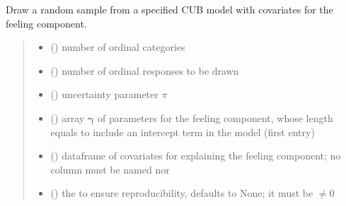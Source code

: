 \documentclass[letterpaper,10pt,english]{sphinxmanual}
\begin{document}

\begin{fulllineitems}
\label{\detokenize{cubmods:cubmods.cub_0w.draw}}
\pysigstartsignatures
{}
\pysigstopsignatures
\sphinxAtStartPar
Draw a random sample from a specified CUB model with covariates for
the feeling component.
\begin{quote}\begin{description}
\begin{itemize}
\item {} 
\sphinxAtStartPar
{} () \textendash{} number of ordinal categories

\item {} 
\sphinxAtStartPar
{} () \textendash{} number of ordinal responses to be drawn

\item {} 
\sphinxAtStartPar
{} () \textendash{} uncertainty parameter \(\pi\)

\item {} 
\sphinxAtStartPar
{} () \textendash{} array \(\pmb \gamma\) of parameters for the feeling component, whose length equals 
 to include an intercept term in the model (first entry)

\item {} 
\sphinxAtStartPar
{} () \textendash{} dataframe of covariates for explaining the feeling component;
no column must be named  nor 

\item {} 
\sphinxAtStartPar
{} (\sphinxstyleliteralemphasis{\sphinxupquote{, }}) \textendash{} the  to ensure reproducibility, defaults to None;
it must be \(\neq 0\)


\end{itemize}
\end{description}
\end{quote}
\end{fulllineitems}
\end{document}

